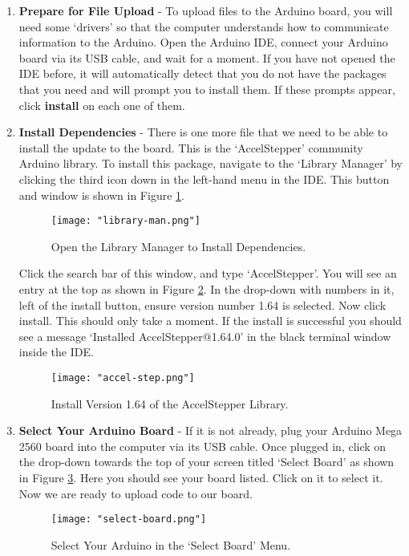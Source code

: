 \documentclass{article}
\begin{document}
\begin{enumerate}
    \item \textbf{Prepare for File Upload} - To upload files to the Arduino board, you will need some `drivers' so that the computer understands how to communicate information to the 
        Arduino. Open the Arduino IDE, connect your Arduino board via its USB cable, and wait for a moment. If you have not opened the IDE before, it will automatically detect that you do not have the packages that you need and will
        prompt you to install them. If these prompts appear, click \textbf{install} on each one of them. 
    \item \textbf{Install Dependencies} - There is one more file that we need to be able to install the update to the board. This is the `AccelStepper' community Arduino library. To install 
        this package, navigate to the `Library Manager' by clicking the third icon down in the left-hand menu in the IDE. This button and window is shown in Figure \ref{fig:ard-lib}. 

        \begin{figure}[h!]
            \centering
            \texttt{[image: "library-man.png"]}
            \caption{Open the Library Manager to Install Dependencies.}
            \label{fig:ard-lib}
        \end{figure}
        \FloatBarrier
        \par

        Click the search bar of this window, and type `AccelStepper'. You will see an entry at the top as shown in Figure \ref{fig:accel-step}. In the drop-down with numbers in it, left
        of the install button, ensure version number 1.64 is selected. Now click install. This should only take a moment. If the install is successful you should see a message 
        `Installed AccelStepper@1.64.0' in the black terminal window inside the IDE. 
        \begin{figure}[h!]
            \centering
            \texttt{[image: "accel-step.png"]}
            \caption{Install Version 1.64 of the AccelStepper Library.}
            \label{fig:accel-step}
        \end{figure}
        \FloatBarrier
    \item \textbf{Select Your Arduino Board} - If it is not already, plug your Arduino Mega 2560 board into the computer via its USB cable. Once plugged in, click on the drop-down towards 
        the top of your screen titled `Select Board' as shown in Figure \ref{fig:select-board}. Here you should see your board listed. Click on it to select it. Now we are ready to upload code to our board.
        \begin{figure}[h!]
            \centering
            \texttt{[image: "select-board.png"]}
            \caption{Select Your Arduino in the `Select Board' Menu.}
            \label{fig:select-board}
        \end{figure}
        \FloatBarrier


\end{enumerate}
\end{document}

